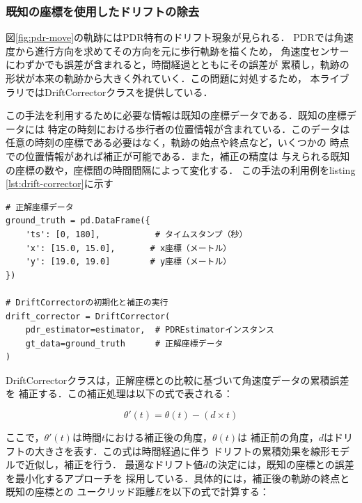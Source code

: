\subsubsection{既知の座標を使用したドリフトの除去}

図\ref{fig:pdr-move}の軌跡にはPDR特有のドリフト現象が見られる．
PDRでは角速度から進行方向を求めてその方向を元に歩行軌跡を描くため，
角速度センサーにわずかでも誤差が含まれると，時間経過とともにその誤差が
累積し，軌跡の形状が本来の軌跡から大きく外れていく．この問題に対処するため，
本ライブラリではDriftCorrectorクラスを提供している．

この手法を利用するために必要な情報は既知の座標データである．既知の座標データには
特定の時刻における歩行者の位置情報が含まれている．このデータは
任意の時刻の座標である必要はなく，軌跡の始点や終点など，いくつかの
時点での位置情報があれば補正が可能である．また，補正の精度は
与えられる既知の座標の数や，座標間の時間間隔によって変化する．
この手法の利用例をlisting \ref{lst:drift-corrector}に示す


\begin{lstlisting}[caption={DriftCorrectorの使用例},label=lst:drift-corrector,float=h]
# 正解座標データ
ground_truth = pd.DataFrame({
    'ts': [0, 180],           # タイムスタンプ（秒）
    'x': [15.0, 15.0],       # x座標（メートル）
    'y': [19.0, 19.0]        # y座標（メートル）
})

# DriftCorrectorの初期化と補正の実行
drift_corrector = DriftCorrector(
    pdr_estimator=estimator,  # PDREstimatorインスタンス
    gt_data=ground_truth      # 正解座標データ
)
\end{lstlisting}



DriftCorrectorクラスは，正解座標との比較に基づいて角速度データの累積誤差を
補正する．この補正処理は以下の式で表される：

\begin{equation}
    \theta'(t) = \theta(t) - (d \times t)
\end{equation}

ここで，$\theta'(t)$は時間$t$における補正後の角度，$\theta(t)$は
補正前の角度，$d$はドリフトの大きさを表す．この式は時間経過に伴う
ドリフトの累積効果を線形モデルで近似し，補正を行う．
最適なドリフト値$d$の決定には，既知の座標との誤差を最小化するアプローチを
採用している．具体的には，補正後の軌跡の終点と既知の座標との
ユークリッド距離$E$を以下の式で計算する：

